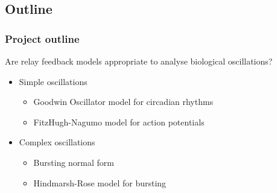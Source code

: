 \documentclass[11pt]{beamer}
\begin{document}
\subsection{Outline}
\begin{frame}
	\frametitle{Project outline}
Are relay feedback models appropriate to analyse biological oscillations?	
\begin{itemize}
\item Simple oscillations
\begin{itemize}
\item Goodwin Oscillator model for circadian rhythms
\item FitzHugh-Nagumo model for action potentials
\end{itemize}
\item Complex oscillations
\begin{itemize}
\item Bursting normal form
\item Hindmarsh-Rose model for bursting
\end{itemize}
\end{itemize}
\end{frame}
\end{document}
